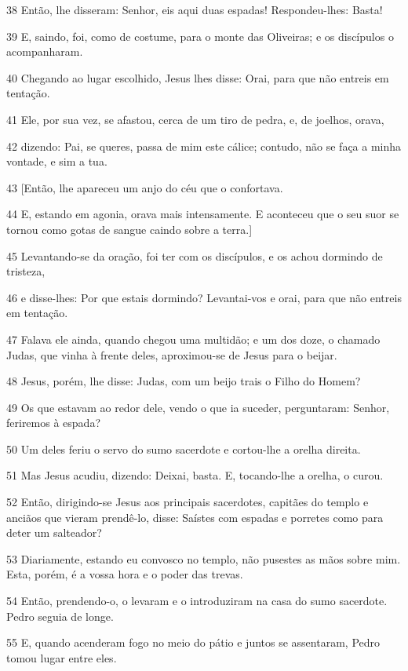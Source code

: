 \par 38 Então, lhe disseram: Senhor, eis aqui duas espadas! Respondeu-lhes: Basta!
\par 39 E, saindo, foi, como de costume, para o monte das Oliveiras; e os discípulos o acompanharam.
\par 40 Chegando ao lugar escolhido, Jesus lhes disse: Orai, para que não entreis em tentação.
\par 41 Ele, por sua vez, se afastou, cerca de um tiro de pedra, e, de joelhos, orava,
\par 42 dizendo: Pai, se queres, passa de mim este cálice; contudo, não se faça a minha vontade, e sim a tua.
\par 43 [Então, lhe apareceu um anjo do céu que o confortava.
\par 44 E, estando em agonia, orava mais intensamente. E aconteceu que o seu suor se tornou como gotas de sangue caindo sobre a terra.]
\par 45 Levantando-se da oração, foi ter com os discípulos, e os achou dormindo de tristeza,
\par 46 e disse-lhes: Por que estais dormindo? Levantai-vos e orai, para que não entreis em tentação.
\par 47 Falava ele ainda, quando chegou uma multidão; e um dos doze, o chamado Judas, que vinha à frente deles, aproximou-se de Jesus para o beijar.
\par 48 Jesus, porém, lhe disse: Judas, com um beijo trais o Filho do Homem?
\par 49 Os que estavam ao redor dele, vendo o que ia suceder, perguntaram: Senhor, feriremos à espada?
\par 50 Um deles feriu o servo do sumo sacerdote e cortou-lhe a orelha direita.
\par 51 Mas Jesus acudiu, dizendo: Deixai, basta. E, tocando-lhe a orelha, o curou.
\par 52 Então, dirigindo-se Jesus aos principais sacerdotes, capitães do templo e anciãos que vieram prendê-lo, disse: Saístes com espadas e porretes como para deter um salteador?
\par 53 Diariamente, estando eu convosco no templo, não pusestes as mãos sobre mim. Esta, porém, é a vossa hora e o poder das trevas.
\par 54 Então, prendendo-o, o levaram e o introduziram na casa do sumo sacerdote. Pedro seguia de longe.
\par 55 E, quando acenderam fogo no meio do pátio e juntos se assentaram, Pedro tomou lugar entre eles.
